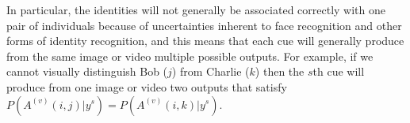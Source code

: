 In particular, the identities will not generally be associated correctly with one pair of individuals because of uncertainties inherent to face recognition and other forms of identity recognition, and this means that each cue will generally produce from the same image or video multiple possible outputs. For example, if we cannot visually distinguish Bob ($j$) from Charlie ($k$) then the $s$th cue  will produce from one image or video two outputs that satisfy $P(A^{(v)}(i,j)|y^s)=P(A^{(v)}(i,k)|y^s)$. 


